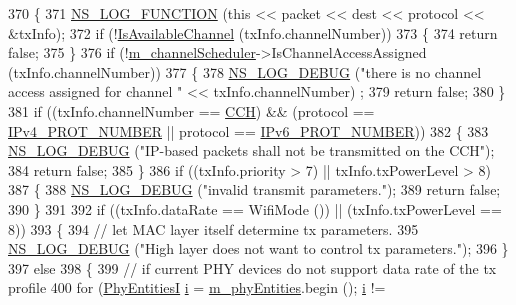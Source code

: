 \begin{DoxyCode}
370 \{
371   \hyperlink{log-macros-disabled_8h_a90b90d5bad1f39cb1b64923ea94c0761}{NS\_LOG\_FUNCTION} (\textcolor{keyword}{this} << packet << dest << protocol << &txInfo);
372   \textcolor{keywordflow}{if} (!\hyperlink{classns3_1_1WaveNetDevice_a56b63f50ec806a4a50397aa8ac4d6231}{IsAvailableChannel} (txInfo.channelNumber))
373     \{
374       \textcolor{keywordflow}{return} \textcolor{keyword}{false};
375     \}
376   \textcolor{keywordflow}{if} (!\hyperlink{classns3_1_1WaveNetDevice_a64edd74de0dc4af431f2d08aad19a9d1}{m\_channelScheduler}->IsChannelAccessAssigned (txInfo.channelNumber))
377     \{
378       \hyperlink{group__logging_ga413f1886406d49f59a6a0a89b77b4d0a}{NS\_LOG\_DEBUG} (\textcolor{stringliteral}{"there is no channel access assigned for channel "} << txInfo.channelNumber)
      ;
379       \textcolor{keywordflow}{return} \textcolor{keyword}{false};
380     \}
381   \textcolor{keywordflow}{if} ((txInfo.channelNumber == \hyperlink{channel-manager_8h_a52d2f169cde2f6abe66ecc83f0d7ad80}{CCH}) && (protocol == \hyperlink{classns3_1_1WaveNetDevice_aea82cd6718f17f1d2e585c23e4d76100}{IPv4\_PROT\_NUMBER} || protocol == 
      \hyperlink{classns3_1_1WaveNetDevice_a8b18e42ab92375ead7121c02c79e802f}{IPv6\_PROT\_NUMBER}))
382     \{
383       \hyperlink{group__logging_ga413f1886406d49f59a6a0a89b77b4d0a}{NS\_LOG\_DEBUG} (\textcolor{stringliteral}{"IP-based packets shall not be transmitted on the CCH"});
384       \textcolor{keywordflow}{return} \textcolor{keyword}{false};
385     \}
386   \textcolor{keywordflow}{if} ((txInfo.priority > 7) || txInfo.txPowerLevel > 8)
387     \{
388       \hyperlink{group__logging_ga413f1886406d49f59a6a0a89b77b4d0a}{NS\_LOG\_DEBUG} (\textcolor{stringliteral}{"invalid transmit parameters."});
389       \textcolor{keywordflow}{return} \textcolor{keyword}{false};
390     \}
391 
392   \textcolor{keywordflow}{if} ((txInfo.dataRate == WifiMode ()) ||  (txInfo.txPowerLevel == 8))
393     \{
394       \textcolor{comment}{// let MAC layer itself determine tx parameters.}
395       \hyperlink{group__logging_ga413f1886406d49f59a6a0a89b77b4d0a}{NS\_LOG\_DEBUG} (\textcolor{stringliteral}{"High layer does not want to control tx parameters."});
396     \}
397   \textcolor{keywordflow}{else}
398     \{
399       \textcolor{comment}{// if current PHY devices do not support data rate of the  tx profile}
400       \textcolor{keywordflow}{for} (\hyperlink{classns3_1_1WaveNetDevice_ab7544e360cf30da8b42e84caf14c8e8a}{PhyEntitiesI} \hyperlink{bernuolliDistribution_8m_a6f6ccfcf58b31cb6412107d9d5281426}{i} = \hyperlink{classns3_1_1WaveNetDevice_a60401868abeed63f3218b78c076534a8}{m\_phyEntities}.begin (); \hyperlink{bernuolliDistribution_8m_a6f6ccfcf58b31cb6412107d9d5281426}{i} != 

\end{DoxyCode}
